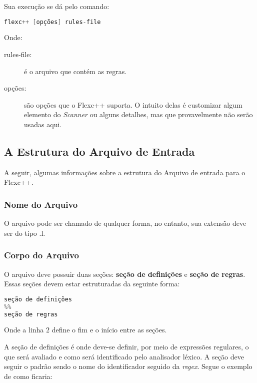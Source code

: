 \begin{apendicesenv}
Sua execução se dá pelo comando:
\begin{lstlisting}[language=c, label=apendiceCodigoFlex1, caption=Comando para execução do flexc++]
 flexc++ [opções] rules-file
\end{lstlisting}

Onde:
\begin{description}
\item[rules-file:] é o arquivo que contém as regras.
\item[opções:] são opções que o Flexc++ suporta. O intuito delas é customizar algum elemento do \textit{Scanner} ou alguns detalhes, mas que provavelmente não serão usadas aqui. 
\end{description}

\subsection{A Estrutura do Arquivo de Entrada}

A seguir, algumas informações sobre a estrutura do Arquivo de entrada para o Flexc++.

\subsubsection{Nome do Arquivo}

O arquivo pode ser chamado de qualquer forma, no entanto, sua extensão deve ser do tipo .l.

\subsubsection{Corpo do Arquivo}

O arquivo deve possuir duas seções: \textbf{seção de definições} e \textbf{seção de regras}. Essas seções devem estar estruturadas da seguinte forma:

\begin{lstlisting}[language=c, label=apendiceCodigoFlex2, caption=Corpo do arquivo do flexc++]
seção de definições
%%
seção de regras
\end{lstlisting}
\par
\indent Onde a linha $2$ define o fim e o início entre as seções.


A seção de definições é onde deve-se definir, por meio de expressões regulares, o que será avaliado e como será identificado pelo analisador léxico. A seção deve seguir o padrão sendo o nome do identificador seguido da \textit{regex}. Segue o exemplo de como ficaria:


\end{apendicesenv}
